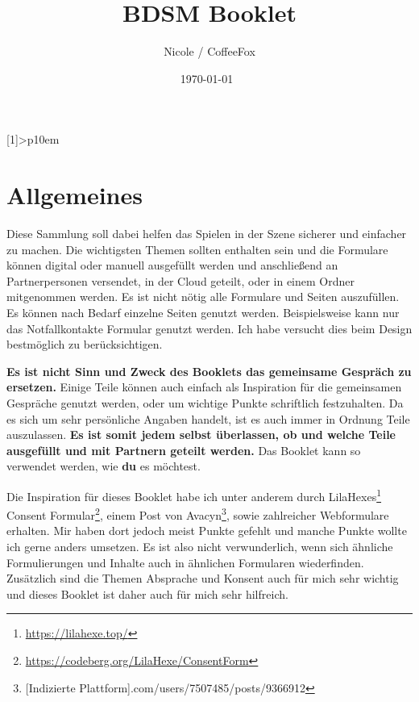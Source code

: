 \documentclass[a4paper,12pt]{article}
\begin{document}
\setlength\dashlinedash{0.2pt}
\setlength\dashlinegap{1.5pt}
\setlength\arrayrulewidth{0.3pt}
\newcolumntype{P}[1]{>{\centering\arraybackslash}p{10em}}


\title{BDSM Booklet}
\author{Nicole / CoffeeFox}
\date{\today \ \currenttime \bigbreak {}}
\renewcommand*\contentsname{Inhaltsverzeichnis}

\pagestyle{fancy}
\fancyhead{} %
\fancyfoot{} %
\fancyfoot[LE,RO]{\thepage}


\maketitle
\tableofcontents
\newpage


\section{Allgemeines}
Diese Sammlung soll dabei helfen das Spielen in der Szene sicherer und einfacher zu machen. Die wichtigsten Themen sollten enthalten sein und die Formulare können digital oder manuell ausgefüllt werden und anschließend an Partnerpersonen versendet, in der Cloud geteilt, oder in einem Ordner mitgenommen werden. Es ist nicht nötig alle Formulare und Seiten auszufüllen. Es können nach Bedarf einzelne Seiten genutzt werden. Beispielsweise kann nur das Notfallkontakte Formular genutzt werden. Ich habe versucht dies beim Design bestmöglich zu berücksichtigen. \bigbreak

\textbf{Es ist nicht Sinn und Zweck des Booklets das gemeinsame Gespräch zu ersetzen.} Einige Teile können auch einfach als Inspiration für die gemeinsamen Gespräche genutzt werden, oder um wichtige Punkte schriftlich festzuhalten. Da es sich um sehr persönliche Angaben handelt, ist es auch immer in Ordnung Teile auszulassen. \textbf{Es ist somit jedem selbst überlassen, ob und welche Teile ausgefüllt und mit Partnern geteilt werden.} Das Booklet kann so verwendet werden, wie \textbf{du} es möchtest. \bigbreak

Die Inspiration für dieses Booklet habe ich unter anderem durch LilaHexes\footnote{\url{https://lilahexe.top/}} \glqq Consent Formular\grqq \footnote{\url{https://codeberg.org/LilaHexe/ConsentForm}}, einem Post von Avacyn\footnote{[Indizierte Plattform].com/users/7507485/posts/9366912}, sowie zahlreicher Webformulare erhalten. Mir haben dort jedoch meist Punkte gefehlt und manche Punkte wollte ich gerne anders umsetzen. Es ist also nicht verwunderlich, wenn sich ähnliche Formulierungen und Inhalte auch in ähnlichen Formularen wiederfinden. Zusätzlich sind die Themen Absprache und Konsent auch für mich sehr wichtig und dieses Booklet ist daher auch für mich sehr hilfreich. \bigbreak
\end{document}
